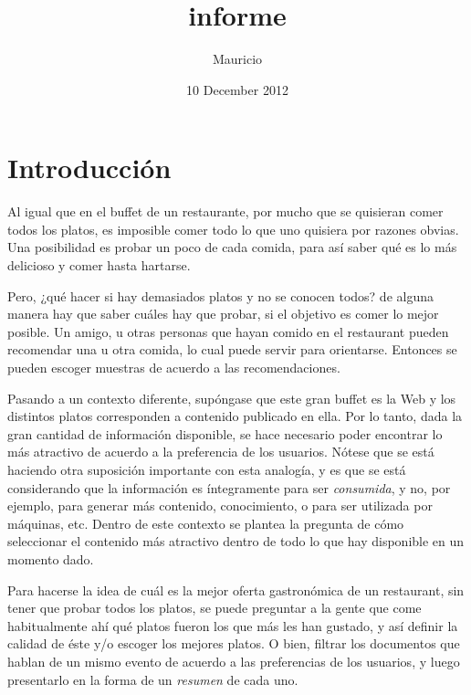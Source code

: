 \documentclass[upright, contnum]{umemoria}
\title{informe}
\author{Mauricio}
\date{10 December 2012}
\begin{document}
\maketitle

\setcounter{tocdepth}{3}
\tableofcontents
\vspace*{1cm}

\chapter{Introducción}
\label{sec-1}


  Al igual que en el buffet de un restaurante, por mucho que se quisieran
  comer todos los platos, es imposible comer todo lo que uno
  quisiera por razones obvias. Una posibilidad es probar un poco de cada
  comida, para así saber qué es lo más delicioso y comer hasta
  hartarse.
  
  Pero, ¿qué hacer si hay demasiados platos y no se conocen todos? de
  alguna manera hay que saber cuáles hay que probar, si el objetivo es
  comer lo mejor posible. Un amigo, u otras personas que hayan comido
  en el restaurant pueden recomendar una u otra comida,
  lo cual puede servir para orientarse. Entonces se pueden escoger
  muestras de acuerdo a las recomendaciones.

  
  Pasando a un contexto diferente, supóngase que este gran buffet es la
  Web y los distintos platos corresponden a contenido publicado en
  ella. Por lo tanto, dada la gran cantidad de información disponible,
  se hace necesario poder encontrar lo más atractivo de acuerdo a la
  preferencia de los usuarios. Nótese que se está
  haciendo otra suposición importante con esta analogía, y es que se
  está considerando que la información es íntegramente para ser
  \emph{consumida}, y no, por ejemplo, para generar más contenido,
  conocimiento, o para ser utilizada por máquinas, etc. Dentro de
  este contexto se plantea la pregunta de cómo seleccionar el contenido
  más atractivo dentro de todo lo que hay disponible en un momento dado.

  Para hacerse la idea de cuál es la mejor oferta gastronómica de un
  restaurant, sin tener que probar todos los platos, se puede
  preguntar a la gente que come habitualmente ahí qué platos fueron
  los que más les han gustado, y así definir la calidad de éste y/o
  escoger los mejores platos. O bien, filtrar los documentos que
  hablan de un mismo evento de acuerdo a las preferencias de los
  usuarios, y luego presentarlo en la forma de un \emph{resumen} de cada
  uno.
\end{document}
